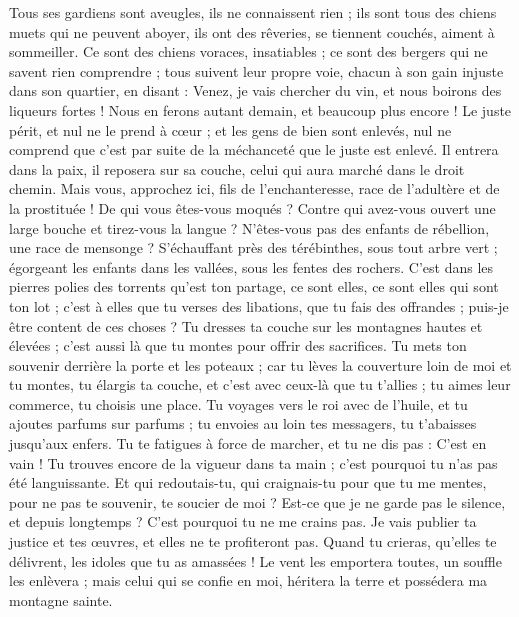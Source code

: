 \begin{multicols}{2}
Tous ses gardiens sont aveugles, ils ne connaissent rien ; ils sont tous des chiens muets qui ne peuvent aboyer, ils ont des rêveries, se tiennent couchés, aiment à sommeiller.
Ce sont des chiens voraces, insatiables ; ce sont des bergers qui ne savent rien comprendre ; tous suivent leur propre voie, chacun à son gain injuste dans son quartier, en disant :
Venez, je vais chercher du vin, et nous boirons des liqueurs fortes ! Nous en ferons autant demain, et beaucoup plus encore !
\VerseOne{}Le juste périt, et nul ne le prend à cœur ; et les gens de bien sont enlevés, nul ne comprend que c'est par suite de la méchanceté que le juste est enlevé.
Il entrera dans la paix, il reposera sur sa couche, celui qui aura marché dans le droit chemin.
Mais vous, approchez ici, fils de l'enchanteresse, race de l'adultère et de la prostituée !
De qui vous êtes-vous moqués ? Contre qui avez-vous ouvert une large bouche et tirez-vous la langue ? N'êtes-vous pas des enfants de rébellion, une race de mensonge ?
S'échauffant près des térébinthes, sous tout arbre vert ; égorgeant les enfants dans les vallées, sous les fentes des rochers.
C'est dans les pierres polies des torrents qu'est ton partage, ce sont elles, ce sont elles qui sont ton lot ; c'est à elles que tu verses des libations, que tu fais des offrandes ; puis-je être content de ces choses ?
Tu dresses ta couche sur les montagnes hautes et élevées ; c'est aussi là que tu montes pour offrir des sacrifices.
Tu mets ton souvenir derrière la porte et les poteaux ; car tu lèves la couverture loin de moi et tu montes, tu élargis ta couche, et c'est avec ceux-là que tu t'allies ; tu aimes leur commerce, tu choisis une place.
Tu voyages vers le roi avec de l'huile, et tu ajoutes parfums sur parfums ; tu envoies au loin tes messagers, tu t'abaisses jusqu'aux enfers.
Tu te fatigues à force de marcher, et tu ne dis pas : C'est en vain ! Tu trouves encore de la vigueur dans ta main ; c'est pourquoi tu n'as pas été languissante.
Et qui redoutais-tu, qui craignais-tu pour que tu me mentes, pour ne pas te souvenir, te soucier de moi ? Est-ce que je ne garde pas le silence, et depuis longtemps ? C'est pourquoi tu ne me crains pas.
Je vais publier ta justice et tes œuvres, et elles ne te profiteront pas.
Quand tu crieras, qu'elles te délivrent, les idoles que tu as amassées ! Le vent les emportera toutes, un souffle les enlèvera ; mais celui qui se confie en moi, héritera la terre et possédera ma montagne sainte.

\end{multicols}
